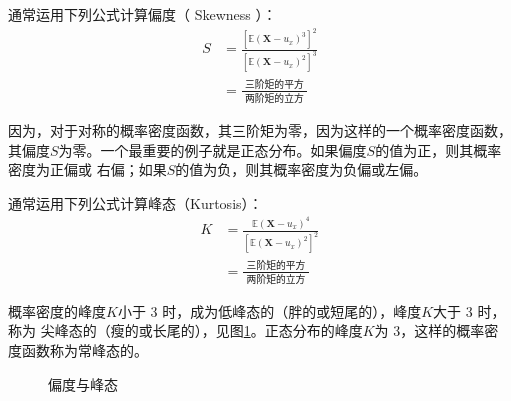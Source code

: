 通常运用下列公式计算偏度（ Skewness ）：
\begin{equation}
    \begin{aligned}
        S & = \frac{\left[\mathbb{E}\left( \boldsymbol{ X }-u_{x}\right)^{3}\right]^{2}}
            {\left[\mathbb{E}\left( \boldsymbol{ X }-u_{x}\right)^{2}\right]^{3}} \\ & = \frac{\text { 三阶矩的平方 }}{\text { 两阶矩的立方 }}
    \end{aligned}
    \label{eq 5.7.1}
\end{equation}

因为，对于对称的概率密度函数，其三阶矩为零，因为这样的一个概率密度函数，其偏度$ S $为零。一个最重要的例子就是正态分布。如果偏度$ S $的值为正，则其概率密度为正偏或
右偏；如果$ S $的值为负，则其概率密度为负偏或左偏。

通常运用下列公式计算峰态（Kurtosis）：
\begin{equation}
    \begin{aligned}
        K & = \frac{\mathbb{E}\left( \boldsymbol{ X } - u_{x}\right)^{4}}{\left[\mathbb{E}\left(\boldsymbol{ X }-u_{x}\right)^{2}\right]^{2}} \\ 
        & = \frac{\text { 三阶矩的平方 }}{\text { 两阶矩的立方 }}
    \end{aligned}
    \label{eq 5.7.2}
\end{equation}

概率密度的峰度$ K $小于 3 时，成为低峰态的（胖的或短尾的），峰度$ K $大于 3 时，称为 尖峰态的（瘦的或长尾的），见图\ref{fig 5.7.1}。正态分布的峰度$ K $为 3，这样的概率密度函数称为常峰态的。

\begin{figure}[hpbt!]
    \caption{偏度与峰态}
    \label{fig 5.7.1}
  \end{figure}


